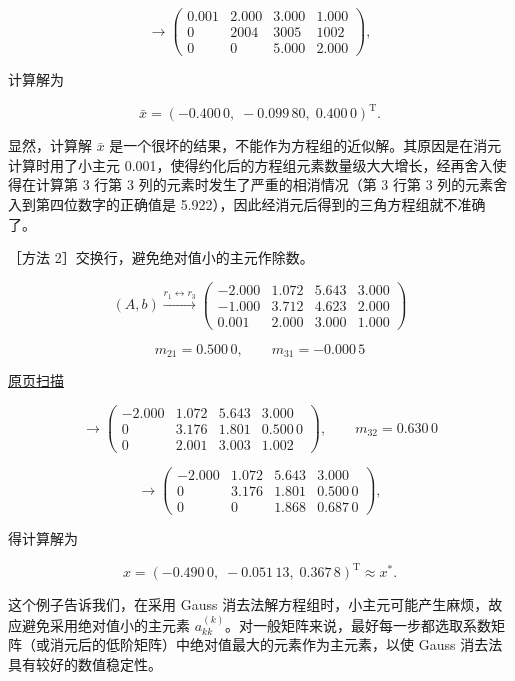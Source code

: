 \documentclass[
  10pt,
  fontset=fandol]{ctexart}
\begin{document}
\[
\longrightarrow\left(\begin{array}{rrr|r}
0.001&2.000&3.000&1.000\\
0&2004&3005&1002\\
0&0&5.000&2.000
\end{array}\right),
\]

计算解为

\[\bar{x}=(-0.400\,0,\;-0.099\,80,\;0.400\,0)^{\mathrm T}.\]

显然，计算解 \(\bar{x}\) 是一个很坏的结果，不能作为方程组的近似解。其原因是在消元计算时用了小主元 0.001，使得约化后的方程组元素数量级大大增长，经再舍入使得在计算第 3 行第 3 列的元素时发生了严重的相消情况（第 3 行第 3 列的元素舍入到第四位数字的正确值是 5.922），因此经消元后得到的三角方程组就不准确了。

［方法 2］交换行，避免绝对值小的主元作除数。

\[
(A,b)\xrightarrow{r_1\leftrightarrow r_3}
\left(\begin{array}{rrr|r}
-2.000&1.072&5.643&3.000\\
-1.000&3.712&4.623&2.000\\
0.001&2.000&3.000&1.000
\end{array}\right)
\]

\[m_{21}=0.500\,0,\qquad m_{31}=-0.000\,5\]

\href{../../source-images/pdf-185.jpeg}{原页扫描}

\[
\longrightarrow\left(\begin{array}{rrr|r}
-2.000&1.072&5.643&3.000\\
0&3.176&1.801&0.500\,0\\
0&2.001&3.003&1.002
\end{array}\right),\qquad m_{32}=0.630\,0
\]

\[
\longrightarrow\left(\begin{array}{rrr|r}
-2.000&1.072&5.643&3.000\\
0&3.176&1.801&0.500\,0\\
0&0&1.868&0.687\,0
\end{array}\right),
\]

得计算解为

\[x=(-0.490\,0,\;-0.051\,13,\;0.367\,8)^{\mathrm T}\approx x^*.\]

这个例子告诉我们，在采用 Gauss 消去法解方程组时，小主元可能产生麻烦，故应避免采用绝对值小的主元素 \(a_{kk}^{(k)}\)。对一般矩阵来说，最好每一步都选取系数矩阵（或消元后的低阶矩阵）中绝对值最大的元素作为主元素，以使 Gauss 消去法具有较好的数值稳定性。
\end{document}
